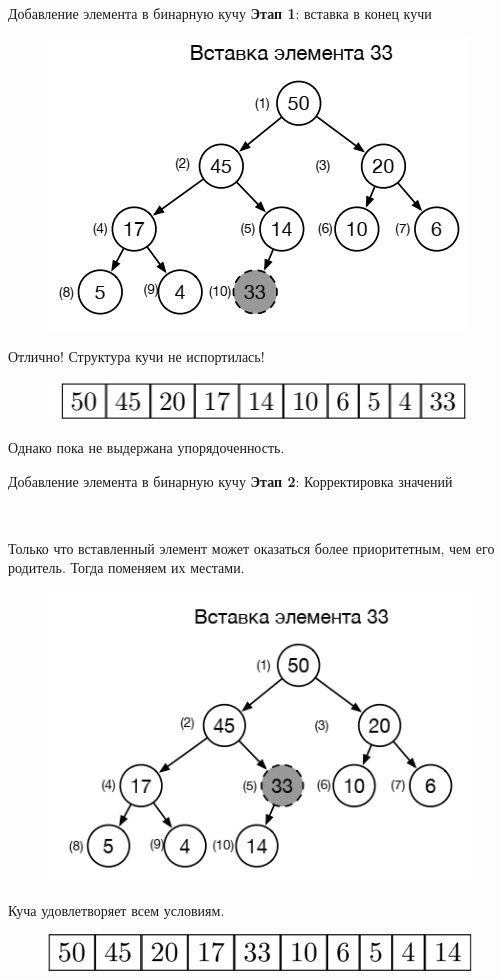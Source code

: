 \documentclass{beamer}
\begin{document}
\begin{frame}{Добавление элемента в бинарную кучу}
	\textbf{Этап 1}: вставка в конец кучи
	\begin{figure}[h]
		\centering
		\includegraphics[scale=0.5]{images/lec06-pic05.png}
	\end{figure}
	Отлично! Структура кучи не испортилась!
	\begin{figure}[h]
		\centering
		\includegraphics[scale=0.5]{images/lec06-pic06.png}
	\end{figure}	
	Однако пока не выдержана упорядоченность.
\end{frame}

\begin{frame}{Добавление элемента в бинарную кучу}
	\textbf{Этап 2}: Корректировка значений
	
	~
	
	Только что вставленный элемент может оказаться более приоритетным, чем его родитель. Тогда поменяем их местами.
	\begin{figure}[h]
		\centering
		\includegraphics[scale=0.5]{images/lec06-pic07.png}
	\end{figure}
	Куча удовлетворяет всем условиям.
	\begin{figure}[h]
		\centering
		\includegraphics[scale=0.4]{images/lec06-pic08.png}
	\end{figure}	
\end{frame}
\end{document}
